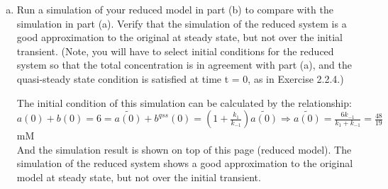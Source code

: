 \documentclass[paper=a4, fontsize=11pt]{scrartcl} %
\numberwithin{equation}{section} %
\numberwithin{figure}{section} %
\numberwithin{table}{section} %
\begin{document}
\begin{enumerate}[a)]
		\item Run a simulation of your reduced model in part (b) to compare with the simulation in part (a). Verify that the simulation of the reduced system is a good approximation to the original at steady state, but not over the initial transient. (Note, you will have to select initial conditions for the reduced system so that the total concentration is in agreement with part (a), and the quasi-steady state condition is satisfied at time t = 0, as in Exercise 2.2.4.)

		The initial condition of this simulation can be calculated by the relationship:\\
		$a(0)+b(0)=6=\tilde{a(0)}+b^{qss}(0)=(1+\frac{k_1}{k_{-1}})\tilde{a(0)}\Rightarrow \tilde{a(0)}=\frac{6k_{-1}}{k_1+k_{-1}}=\frac{48}{19}$ mM\\
		And the simulation result is shown on top of this page (reduced model). The simulation of the reduced system shows a good approximation to the original model at steady state, but not over the initial transient.
	\end{enumerate}
\end{document}
